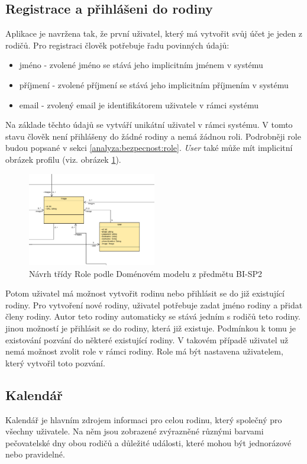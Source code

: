     \subsection{Registrace a přihlášeni do rodiny}
        Aplikace je navržena tak, že první uživatel, který má vytvořit svůj účet je jeden z rodičů. Pro registraci člověk potřebuje řadu povinných údajů:
        \begin{itemize}
	        \item jméno - zvolené jméno se stává jeho implicitním jménem v systému
	        \item příjmení - zvolené příjmení se stává jeho implicitním příjmením v systému
	        \item email - zvolený email je identifikátorem uživatele v rámci systému
        \end{itemize}
        Na základe těchto údajů se vytváří unikátní uživatel v rámci systému. V tomto stavu člověk není přihlášeny do žádné rodiny a nemá žádnou roli. Podrobněji role budou popsané v sekci \ref{analyza:bezpecnost:role}. \textit{User} také může mít implicitní obrázek profilu (viz. obrázek \ref{image:User-Image1}).
        \begin{figure}\centering
	        \includegraphics[width=0.5\textwidth]{pdfs/User-Image1}
	        \caption[Návrh Rolí]{Návrh třídy Role podle Doménovém modelu z předmětu BI-SP2}\label{image:User-Image1}
        \end{figure}
        
        Potom uživatel má možnost vytvořit rodinu nebo přihlásit se do již existující rodiny. Pro vytvoření nové rodiny, uživatel potřebuje zadat jméno rodiny a přidat členy rodiny. Autor teto rodiny automaticky se stává jedním s rodičů teto rodiny. jinou možností je přihlásit se do rodiny, která již existuje. Podmínkou k tomu je existování pozvání do některé existující rodiny. V takovém případě uživatel už nemá možnost zvolit role v rámci rodiny. Role má být nastavena uživatelem, který vytvořil toto pozvání.

    \subsection{Kalendář}    
        Kalendář je hlavním zdrojem informaci pro celou rodinu, který společný pro všechny uživatele. Na něm jsou zobrazené zvýrazněné různými barvami pečovatelské dny obou rodičů a důležité události, které mohou být jednorázové nebo pravidelné. 
        
